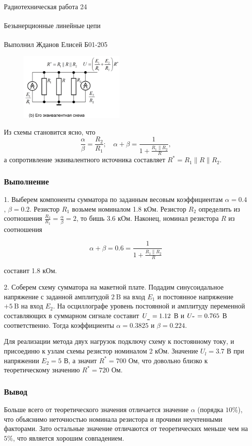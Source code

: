 \documentclass{astroedu-lab}
\begin{document}
\begin{problem}{\huge Радиотехническая работа 24\\\\Безынерционные линейные цепи\\\\Выполнил Жданов Елисей Б01-205}
\begin{figure}[!h]
	\centering
	\includegraphics[width=0.47\textwidth]{17b.png}
	\label{fig:boiler}
\end{figure}

Из схемы становится ясно, что
$$
\frac{\alpha}{\beta}=\frac{R_2}{R_1} ; \quad \alpha+\beta=\frac{1}{1+\frac{R_1 \| R_2}{R}},
$$
а сопротивление эквивалентного источника составляет $R^*=R_1\|R\| R_2$.

\subsubsection{Выполнение}

1. Выберем компоненты сумматора по заданным весовым коэффициентам $\alpha=0.4$, $\beta=0.2$. Резистор $R_1$ возьмем номиналом 1.8 кОм. Резистор $R_2$ определить из соотношения $\frac{R_2}{R_1}=\frac{\alpha}{\beta}=2$, то бишь 3.6 кОм. Наконец, номинал резистора $R$ из соотношения

$$
\alpha+\beta=0.6=\frac{1}{1+\frac{R_1 \| R_2}{R}}
$$

составит 1.8 кОм.

2. Соберем схему сумматора на макетной плате. Подадим синусоидальное напряжение с заданной амплитудой $2 \mathrm{~B}$ на вход $E_1$ и постоянное напряжение $+5 \mathrm{~B}$ на вход $E_2$. На осциллографе уровень постоянной и амплитуду переменной составляющих в суммарном сигнале составит $U_{\verb!_!} = 1.12$ В и $U_{\verb!~!} = 0.765$ В соответственно. Тогда коэффициенты $\alpha = 0.3825$ и $\beta = 0.224$.

Для реализации метода двух нагрузок подключу схему к постоянному току, и присоединю к узлам схемы резистор номиналом 2 кОм. Значение $U_l = 3.7$ В при напряжении $E_2 = 5$ В, а значит $R^* = 700$ Ом, что довольно близко к теоретическому значению $R^* = 720$ Ом.

\subsubsection{Вывод}

Больше всего от теоретического значения отличается значение $\alpha$ (порядка $10\%$), что объяснимо неточностью номинала резистора и прочими неучтенными факторами. Зато остальные значение отличаются от теоретических меньше чем на $5\%$, что является хорошим совпадением.


\end{problem}
\end{document}
